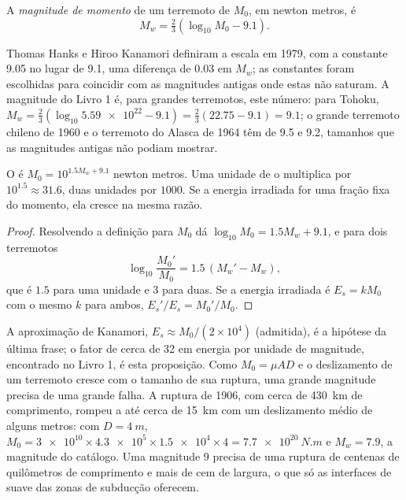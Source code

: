\begin{definition}\label{def:b1:earthquake-source:mw}
A \emph{magnitude de momento} de um terremoto de  $M_0$, em newton metros, é
\[
  M_w = \tfrac23\left(\log_{10} M_0 - 9.1\right) .
\]
\end{definition}

Thomas Hanks e Hiroo Kanamori definiram a escala em 1979, com a constante 9.05 no lugar de 9.1, uma diferença de 0.03 em $M_w$; as constantes foram escolhidas para coincidir com as magnitudes antigas onde estas não saturam. A magnitude do Livro 1 é, para grandes terremotos, este número: para Tohoku,
$M_w = \tfrac23(\log_{10}\num{5.59e22} - 9.1) = \tfrac23(22.75 - 9.1) = 9.1$;
o grande terremoto chileno de 1960 e o terremoto do Alasca de 1964 têm  de 9.5 e 9.2, tamanhos que as magnitudes antigas não podiam mostrar.

\begin{proposition}\label{prop:b1:earthquake-source:moment-steps}
O  é $M_0 = 10^{1.5 M_w + 9.1}$ newton metros. Uma unidade de  o multiplica por $10^{1.5} \approx 31.6$, duas unidades por
$1000$. Se a energia irradiada for uma fração fixa do momento, ela cresce na mesma razão.
\end{proposition}

\begin{proof}
Resolvendo a definição para $M_0$ dá $\log_{10} M_0 = 1.5 M_w + 9.1$, e para dois terremotos
\[
  \log_{10}\frac{M_0'}{M_0} = 1.5\,(M_w' - M_w) ,
\]
que é $1.5$ para uma unidade e $3$ para duas. Se a energia irradiada é $E_s = k M_0$ com o mesmo $k$ para ambos, $E_s'/E_s = M_0'/M_0$.
\end{proof}

A aproximação de Kanamori, $E_s \approx M_0/(2\times10^4)$ (admitida), é a hipótese da última frase; o fator de cerca de 32 em energia por unidade de magnitude, encontrado no Livro 1, é esta proposição. Como $M_0 = \mu A D$ e o deslizamento de um terremoto cresce com o tamanho de sua ruptura, uma grande magnitude precisa de uma grande falha. A ruptura de 1906, com cerca de \qty{430}{km} de comprimento, rompeu a  até cerca de \qty{15}{km} com um deslizamento médio de alguns metros:
com $D = \qty{4}{m}$, $M_0 = \num{3e10}\times\num{4.3e5}\times\num{1.5e4}
\times 4 = \qty{7.7e20}{N.m}$ e $M_w = 7.9$, a magnitude do catálogo.
Uma magnitude 9 precisa de uma ruptura de centenas de quilômetros de comprimento e mais de cem de largura, o que só as interfaces de  suave das zonas de subducção oferecem.

